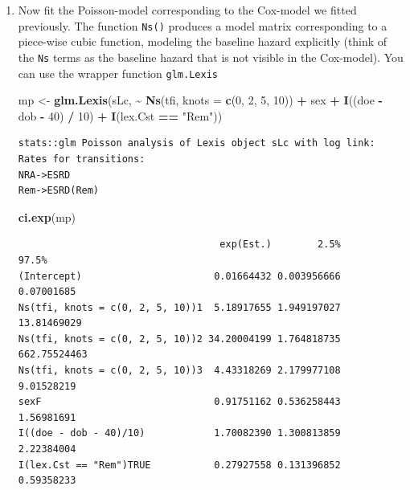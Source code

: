 \documentclass[
]{book}
\newenvironment{Shaded}{\begin{snugshade}}{\end{snugshade}}
\newcommand{\AttributeTok}[1]{\textcolor[rgb]{0.13,0.29,0.53}{#1}}
\newcommand{\DecValTok}[1]{\textcolor[rgb]{0.00,0.00,0.81}{#1}}
\newcommand{\FunctionTok}[1]{\textcolor[rgb]{0.13,0.29,0.53}{\textbf{#1}}}
\newcommand{\NormalTok}[1]{#1}
\newcommand{\OtherTok}[1]{\textcolor[rgb]{0.56,0.35,0.01}{#1}}
\newcommand{\SpecialCharTok}[1]{\textcolor[rgb]{0.81,0.36,0.00}{\textbf{#1}}}
\newcommand{\StringTok}[1]{\textcolor[rgb]{0.31,0.60,0.02}{#1}}
\theoremstyle{definition}
\theoremstyle{definition}
\theoremstyle{definition}
\theoremstyle{definition}
\theoremstyle{remark}
\begin{document}
\begin{enumerate}
\begin{verbatim}

Transitions:
     To
From   NRA  Rem ESRD ESRD(Rem) Records: Events: Risk time: Persons:
  NRA 9854   29   69         0     9952      98     824.77      122
  Rem    0 3139    0         8     3147       8     259.90       32
  Sum 9854 3168   69         8    13099     106    1084.67      125
\end{verbatim}
\item
  Now fit the Poisson-model corresponding to the Cox-model
  we fitted previously. The function \texttt{Ns()} produces a model
  matrix corresponding to a piece-wise cubic function, modeling the
  baseline hazard explicitly (think of the \texttt{Ns} terms as the
  baseline hazard that is not visible in the Cox-model). You
  can use the wrapper function \texttt{glm.Lexis}

\begin{Shaded}
\begin{Highlighting}[]
\NormalTok{mp }\OtherTok{\textless{}{-}} \FunctionTok{glm.Lexis}\NormalTok{(sLc, }
                \SpecialCharTok{\textasciitilde{}} \FunctionTok{Ns}\NormalTok{(tfi, }\AttributeTok{knots =} \FunctionTok{c}\NormalTok{(}\DecValTok{0}\NormalTok{, }\DecValTok{2}\NormalTok{, }\DecValTok{5}\NormalTok{, }\DecValTok{10}\NormalTok{)) }\SpecialCharTok{+}
\NormalTok{                  sex }\SpecialCharTok{+} \FunctionTok{I}\NormalTok{((doe }\SpecialCharTok{{-}}\NormalTok{ dob }\SpecialCharTok{{-}} \DecValTok{40}\NormalTok{) }\SpecialCharTok{/} \DecValTok{10}\NormalTok{) }\SpecialCharTok{+} 
                  \FunctionTok{I}\NormalTok{(lex.Cst }\SpecialCharTok{==} \StringTok{"Rem"}\NormalTok{))}
\end{Highlighting}
\end{Shaded}

\begin{verbatim}
stats::glm Poisson analysis of Lexis object sLc with log link:
Rates for transitions:
NRA->ESRD
Rem->ESRD(Rem)
\end{verbatim}

\begin{Shaded}
\begin{Highlighting}[]
\FunctionTok{ci.exp}\NormalTok{(mp)}
\end{Highlighting}
\end{Shaded}

\begin{verbatim}
                                   exp(Est.)        2.5%        97.5%
(Intercept)                       0.01664432 0.003956666   0.07001685
Ns(tfi, knots = c(0, 2, 5, 10))1  5.18917655 1.949197027  13.81469029
Ns(tfi, knots = c(0, 2, 5, 10))2 34.20004199 1.764818735 662.75524463
Ns(tfi, knots = c(0, 2, 5, 10))3  4.43318269 2.179977108   9.01528219
sexF                              0.91751162 0.536258443   1.56981691
I((doe - dob - 40)/10)            1.70082390 1.300813859   2.22384004
I(lex.Cst == "Rem")TRUE           0.27927558 0.131396852   0.59358233
\end{verbatim}


\end{enumerate}
\end{document}
